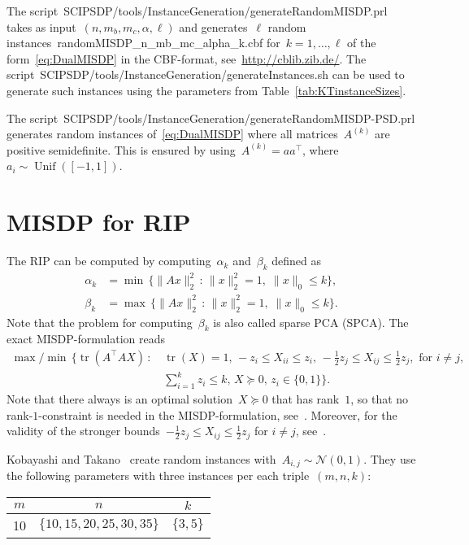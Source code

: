 \documentclass[11pt,a4paper]{article}
\newcommand{\norm}[1]{\lVert{#1}\rVert}
\newcommand{\suchthat}{\, : \,}
\newcommand{\T}{^\top}
\newcommand{\normal}{\mathcal{N}}
\DeclareMathOperator{\tr}{tr}
\DeclareMathOperator{\unif}{Unif}
\theoremstyle{definition}
\begin{document}
The
script~\textsf{SCIPSDP/tools/InstanceGeneration/generateRandomMISDP.prl}
takes as input~$(n,m_b,m_c,\alpha,\ell)$ and generates~$\ell$ random
instances~\textsf{randomMISDP\_n\_mb\_mc\_alpha\_k.cbf}
for~$k = 1,\dots,\ell$ of the form~\eqref{eq:DualMISDP} in the CBF-format,
see~\url{http://cblib.zib.de/}. The
script~\textsf{SCIPSDP/tools/InstanceGeneration/generateInstances.sh} can
be used to generate such instances using the parameters from
Table~\ref{tab:KTinstanceSizes}.

The
script~\textsf{SCIPSDP/tools/InstanceGeneration/generateRandomMISDP-PSD.prl}
generates random instances of~\eqref{eq:DualMISDP} where all
matrices~$A^{(k)}$ are positive semidefinite. This is ensured by
using~$A^{(k)} = aa\T$, where~$a_i \sim \unif([-1,1])$.


\section{MISDP for RIP}
\label{sec:RandomRIP}

The RIP can be computed by computing~$\alpha_k$ and~$\beta_k$ defined as
\begin{align}
  \alpha_k &= \min\, \{\norm{Ax}_2^2 \suchthat \norm{x}_2^2 = 1, \;
             \norm{x}_0 \leq k\}, \label{eq:RIPalpha} \\
  \beta_k &=  \max\, \{\norm{Ax}_2^2 \suchthat \norm{x}_2^2 = 1, \;
             \norm{x}_0 \leq k\}. \label{eq:RIPbeta}
\end{align}
Note that the problem for computing~$\beta_k$ is also called sparse PCA (SPCA).
The exact MISDP-formulation reads
\begin{align}\label{eq:MISDPRIP}
  \max/\min\, \Big\{\tr(A\T AX) \suchthat
  &\tr(X) = 1, \, -z_i \leq X_{ii} \leq
  z_i,\, -\tfrac{1}{2}z_j \leq X_{ij} \leq \tfrac{1}{2}z_j, \text{ for } i
    \neq j, \\
  &\sum_{i=1}^k z_i\leq k,\, X \succeq 0,\, z_i \in \{0,1\}\Big\}.
\end{align}
Note that there always is an optimal solution~$X \succeq 0$ that has
rank~$1$, so that no rank-$1$-constraint is needed in the
MISDP-formulation, see~\cite[Theorem 4]{GalP16}. Moreover, for the
validity of the stronger bounds~$-\tfrac{1}{2}z_j \leq X_{ij} \leq
\tfrac{1}{2}z_j$ for $i \neq j$, see~\cite[Lemma 1]{GalP16}.

Kobayashi and Takano~\cite{Kob20} create random instances
with~$A_{i,j} \sim \normal(0,1)$. They use the following parameters with
three instances per each triple~$(m,n,k)$:
\begin{table}[h]
  \centering
  \begin{tabular}{ccc}
    $m$ & $n$ & $k$ \\
    \toprule
    10 & $\{10,15,20,25,30,35\}$ & $\{3,5\}$
  \end{tabular}
\end{table}
\end{document}
